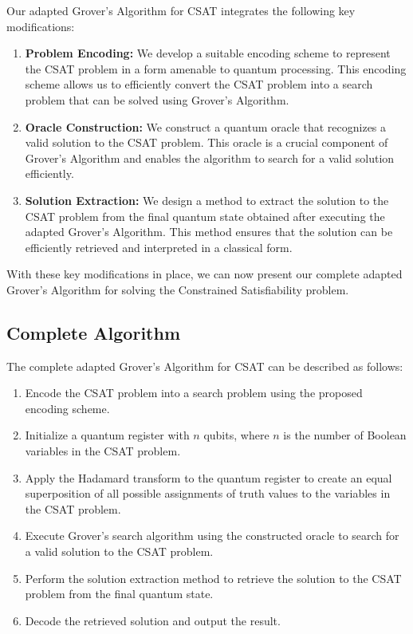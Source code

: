 Our adapted Grover's Algorithm for CSAT integrates the following key modifications:

\begin{enumerate}
    \item \textbf{Problem Encoding:} We develop a suitable encoding scheme to represent the CSAT problem in a form amenable to quantum processing. This encoding scheme allows us to efficiently convert the CSAT problem into a search problem that can be solved using Grover's Algorithm.
    
    \item \textbf{Oracle Construction:} We construct a quantum oracle that recognizes a valid solution to the CSAT problem. This oracle is a crucial component of Grover's Algorithm and enables the algorithm to search for a valid solution efficiently.
    
    \item \textbf{Solution Extraction:} We design a method to extract the solution to the CSAT problem from the final quantum state obtained after executing the adapted Grover's Algorithm. This method ensures that the solution can be efficiently retrieved and interpreted in a classical form.
\end{enumerate}

With these key modifications in place, we can now present our complete adapted Grover's Algorithm for solving the Constrained Satisfiability problem.

\subsection{Complete Algorithm}

The complete adapted Grover's Algorithm for CSAT can be described as follows:

\begin{enumerate}
    \item Encode the CSAT problem into a search problem using the proposed encoding scheme.
    
    \item Initialize a quantum register with $n$ qubits, where $n$ is the number of Boolean variables in the CSAT problem.
    
    \item Apply the Hadamard transform to the quantum register to create an equal superposition of all possible assignments of truth values to the variables in the CSAT problem.
    
    \item Execute Grover's search algorithm using the constructed oracle to search for a valid solution to the CSAT problem.
    
    \item Perform the solution extraction method to retrieve the solution to the CSAT problem from the final quantum state.
    
    \item Decode the retrieved solution and output the result.
\end{enumerate}

